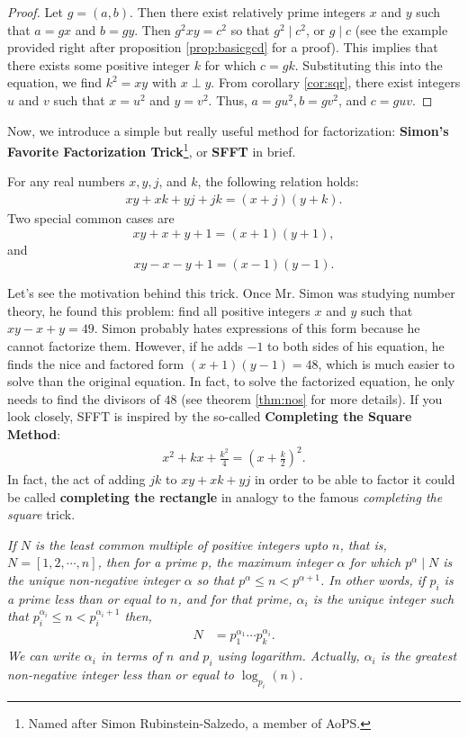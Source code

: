 \documentclass{subfile}
\begin{document}
	\begin{proof}
		Let $g=(a,b)$. Then there exist relatively prime integers $x$ and $y$ such that $a=gx$ and $b=gy$. Then $g^2xy=c^2$ so that $g^2\mid c^2$, or $g\mid c$ (see the example provided right after proposition \eqref{prop:basicgcd} for a proof). This implies that there exists some positive integer $k$ for which $c=gk$. Substituting this into the equation, we find $k^2=xy$ with $x\perp y$. From corollary \eqref{cor:sqr}, there exist integers $u$ and $v$ such that $x=u^2$ and $y=v^2$. Thus, $a=gu^2,b=gv^2$, and $c=guv$.
	\end{proof}
	Now, we introduce a simple but really useful method for factorization: \textbf{Simon's Favorite Factorization Trick}\footnote{Named after Simon Rubinstein-Salzedo, a member of AoPS.}, or \textbf{SFFT} in brief.
	\begin{proposition}[SFFT]
		For any real numbers $x,y, j$, and $k$, the following relation holds:
		\begin{align*}
			xy+xk+yj+jk=(x+j)(y+k).
		\end{align*}
		Two special common cases are $$xy + x + y + 1 = (x+1)(y+1),$$ and $$xy - x - y +1 = (x-1)(y-1).$$
	\end{proposition}
	Let's see the motivation behind this trick. Once Mr. Simon was studying number theory, he found this problem: find all positive integers $x$ and $y$ such that $xy-x+y=49$. Simon probably hates expressions of this form because he cannot factorize them. However, if he adds $-1$ to both sides of his equation, he finds the nice and factored form $(x+1)(y-1)=48$, which is much easier to solve than the original equation. In fact, to solve the factorized equation, he only needs to find the divisors of $48$ (see theorem \autoref{thm:nos} for more details). If you look closely, SFFT is inspired by the so-called \textbf{Completing the Square Method}:
	\begin{align*}
		x^2+kx+\frac{k^2}{4}=\left(x+\frac{k}{2}\right)^2.
	\end{align*}
	In fact, the act of adding ${jk}$ to ${xy}+{xk}+{yj}$ in order to be able to factor it could be called \textbf{completing the rectangle} in analogy to the famous \textit{completing the square} trick.
	\begin{theorem}\slshape\label{thm:lcmfactor}
		If $N$ is the least common multiple of positive integers upto $n$, that is, $N=[1,2,\cdots,n]$, then for a prime $p$, the maximum  integer $\alpha$ for which $p^\alpha\mid N$ is the unique non-negative integer $\alpha$ so that $p^\alpha\leq n<p^{\alpha+1}$. In other words, if $p_i$ is a prime less than or equal to $n$, and for that prime, $\alpha_i$ is the unique integer such that $p_i^{\alpha _i}\leq n<p_i^{\alpha_i+1}$ then,
		\begin{align*}
			N & = p_1^{\alpha _1}\cdots p_k^{\alpha_i}.
		\end{align*}\label{thm:lcm}
		We can write $\alpha _i$ in terms of $n$ and $p_i$ using logarithm. Actually, $\alpha_i$ is the greatest non-negative integer less than or equal to $\log_{p_i}(n)$.
	\end{theorem}
\end{document}
